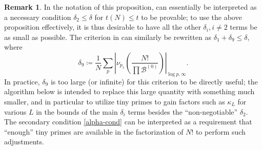 \documentclass[10pt,a4paper,reqno]{amsart}
\numberwithin{equation}{section}
\theoremstyle{plain}
\theoremstyle{definition}
\newtheorem{remark}[theorem]{Remark}
\newcommand\tuple{{\mathcal B}}
\begin{document}
\begin{remark} In the notation of this proposition,  can essentially be interpreted as a necessary condition $\delta_2 \leq \delta$ for $t(N) \leq t$ to be provable; to use the above proposition effectively, it is thus desirable to have all the other $\delta_i, i \neq 2$ terms be as small as possible.  The criterion in  can similarly be rewritten as $\delta_1+\delta_9 \leq \delta$, where
  $$ \delta_9 \coloneqq \frac{1}{N} \sum_p \left|\nu_{p_1}\left( \frac{N!}{\prod \tuple^{(0)}} \right)\right|_{\log p, \infty}.$$
In practice, $\delta_9$ is too large (or infinite) for this criterion to be directly useful; the algorithm below is intended to replace this large quantity with something much smaller, and in particular to utilize tiny primes to gain factors such as $\kappa_L$ for various $L$ in the bounds of the main $\delta_i$ terms besides the ``non-negotiable'' $\delta_2$.  The secondary condition \eqref{alpha-cond} can be interpreted as a requirement that ``enough'' tiny primes are available in the factorization of $N!$ to perform such adjustments.
\end{remark}
\end{document}
